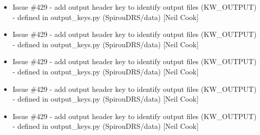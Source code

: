 \documentclass[a4paper,10pt,english]{report}
\begin{document}
\begin{itemize}
\item {} 
Issue \#429 - add output header key to identify output files
(KW\_OUTPUT) - defined in output\_keys.py (SpirouDRS/data) {[}Neil Cook{]}

\item {} 
Issue \#429 - add output header key to identify output files
(KW\_OUTPUT) - defined in output\_keys.py (SpirouDRS/data) {[}Neil Cook{]}

\item {} 
Issue \#429 - add output header key to identify output files
(KW\_OUTPUT) - defined in output\_keys.py (SpirouDRS/data) {[}Neil Cook{]}

\item {} 
Issue \#429 - add output header key to identify output files
(KW\_OUTPUT) - defined in output\_keys.py (SpirouDRS/data) {[}Neil Cook{]}

\item {} 
Issue \#429 - add output header key to identify output files
(KW\_OUTPUT) - defined in output\_keys.py (SpirouDRS/data) {[}Neil Cook{]}

\end{itemize}
\end{document}
